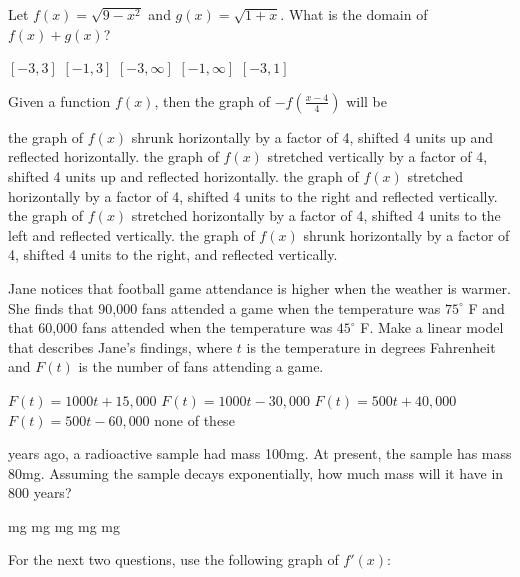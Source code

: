 \documentclass[11pt]{article}
\begin{document}
\begin{questions}
\begin{multiplechoice}{5}
\begin{questions}
\begin{multiplechoice}{5}
\question Let $f(x) = \sqrt{9-x^2}$ and $g(x)=\sqrt{1+x}$.  What is the domain of $f(x)+g(x)$?
\begin{answers}{2}
\ans $[-3,3]$
\ans $[-1,3]$
\ans $[-3,\infty]$
\ans $[-1,\infty]$
\ans $[-3,1]$
\end{answers}

\nextpage

\question Given a function $f(x)$, then the graph of $-f\left(\frac{x-4}{4}\right)$ will be
\begin{answers}{2}
\ans the graph of $f(x)$ shrunk horizontally by a factor of 4, shifted 4 units up and reflected horizontally.
\ans the graph of $f(x)$ stretched vertically by a factor of 4, shifted 4 units up and reflected horizontally.
\ans the graph of $f(x)$ stretched horizontally by a factor of 4, shifted 4 units to the right and reflected vertically.
\ans the graph of $f(x)$ stretched horizontally by a factor of 4, shifted 4 units to the left and reflected vertically. %
\ans the graph of $f(x)$ shrunk horizontally by a factor of 4, shifted 4 units to the right, and reflected vertically.
\end{answers}


\question Jane notices that football game attendance is higher when the weather is warmer.  She finds that 90,000 fans attended a game when the temperature was $75^\circ$ F and that 60,000 fans attended when the temperature was $45^\circ$ F.  Make a linear model that describes Jane's findings, where $t$ is the temperature in degrees Fahrenheit and $F(t)$ is the number of fans attending a game.
\begin{answers}{3}
\ans $F(t) = 1000t+15,000$
\ans $F(t) = 1000t-30,000$
\ans $F(t) = 500t+40,000$
\ans $F(t) = 500t - 60,000$
\ans none of these
\end{answers}

 years ago, a radioactive sample had mass 100mg.  At present, the sample has mass 80mg.  Assuming the sample decays exponentially, how much mass will it have in 800 years?
\begin{answers}{2}
 mg
 mg %
 mg
 mg
 mg
\end{answers}




For the next two questions, use the following graph of $f'(x)$:\\



\end{multiplechoice}
\end{questions}
\end{multiplechoice}
\end{questions}
\end{document}
